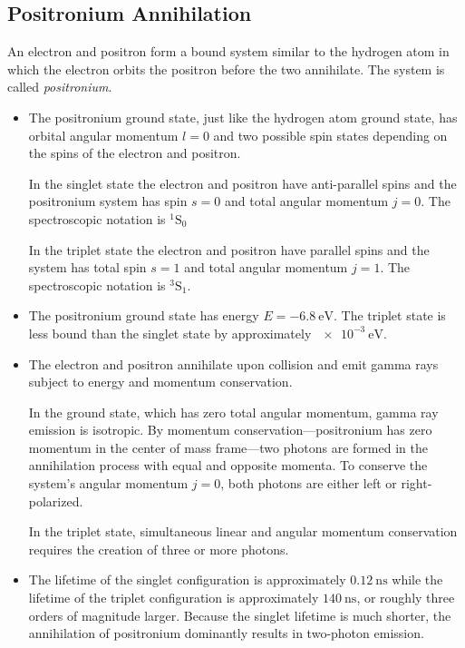 \documentclass[11pt, a4paper]{article}
\begin{document}
\subsection{Positronium Annihilation}
An electron and positron form a bound system similar to the hydrogen atom in which the electron orbits the positron before the two annihilate. The system is called \textit{positronium}. 
\begin{itemize}
	\item The positronium ground state, just like the hydrogen atom ground state, has orbital angular momentum $ l = 0 $ and two possible spin states depending on the spins of the electron and positron.
	
	In the singlet state the electron and positron have anti-parallel spins and the positronium system has spin $ s = 0 $ and total angular momentum $ j = 0 $. The spectroscopic notation is $ {}^{1}\text{S}_{0} $
	
	In the triplet state the electron and positron have parallel spins and the system has total spin $ s = 1 $ and total angular momentum $ j = 1 $. The spectroscopic notation is $ {}^{3}\text{S}_{1} $.
	
	\item The positronium ground state has energy $ E = -\SI{6.8}{\electronvolt} $. The triplet state is less bound than the singlet state by approximately $ \SI{e-3}{\electronvolt} $.
	
	\item The electron and positron annihilate upon collision and emit gamma rays subject to energy and momentum conservation. 
	
	In the ground state, which has zero total angular momentum, gamma ray emission is isotropic. By momentum conservation---positronium has zero momentum in the center of mass frame---two photons are formed in the annihilation process with equal and opposite momenta. To conserve the system's angular momentum $ j = 0 $, both photons are either left or right-polarized.
	
	In the triplet state, simultaneous linear and angular momentum conservation requires the creation of three or more photons. 
	
	\item The lifetime of the singlet configuration is approximately $ \SI{0.12}{\nano \second} $ while the lifetime of the triplet configuration is approximately $ \SI{140}{\nano \second} $, or roughly three orders of magnitude larger. Because the singlet lifetime is much shorter, the annihilation of positronium dominantly results in two-photon emission. 
\end{itemize}
\end{document}
